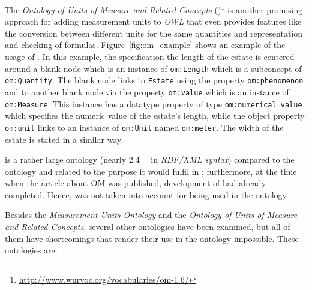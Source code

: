 The \emph{Ontology of Units of Measure and Related Concepts} ()\footnote{\href{http://www.wurvoc.org/vocabularies/om-1.6/}{http://www.wurvoc.org/vocabularies/om-1.6/}}\cite{OM} is another promising approach for adding measurement units to \emph{OWL} that even provides features like the conversion between different units for the same quantities and representation and checking of formulas. Figure~\ref{fig:om_example} shows an example of the usage of . In this example, the specification the length of the estate is centered around a blank node which is an instance of \texttt{om:Length} which is a subconcept of \texttt{om:Quantity}. The blank node links to \texttt{Estate} using the property \texttt{om:phenomenon} and to another blank node via the property \texttt{om:value} which is an instance of \texttt{om:Measure}. This instance has a datatype property of type \texttt{om:numerical\_value} which specifies the numeric value of the estate's length, while the object property \texttt{om:unit} links 
to an instance of \texttt{om:Unit} named \texttt{om:meter}. The width of the estate is stated in a similar way.

 is a rather large ontology (nearly \SI{2.4}{\mebi\byte} in \emph{RDF/XML syntax}) compared to the \thinkhomeweather ontology and related to the purpose it would fulfil in \thinkhomeweather; furthermore, at the time when the article about OM was published, development of \thinkhomeweather had already completed. Hence,  was not taken into account for being used in the \thinkhomeweather ontology.

Besides the \emph{Measurement Units Ontology} and the \emph{Ontology of Units of Measure and Related Concepts}, several other ontologies have been examined, but all of them have shortcomings that render their use in the \thinkhomeweather ontology impossible. These ontologies are:

